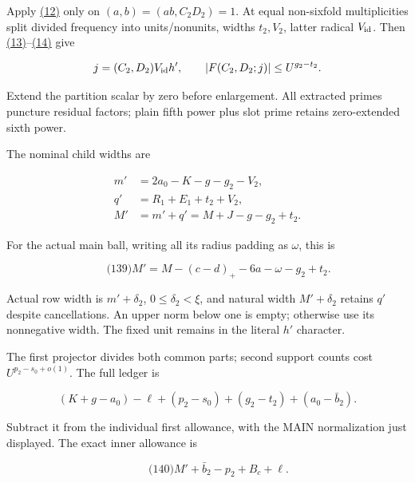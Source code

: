 Apply \protect\hyperlink{cf:eq:A.16}{(12)} only on \((a,b)=(ab,C_2D_2)=1\). At equal non-sixfold multiplicities split divided frequency into units/nonunits, widths \(t_2,V_2\), latter radical \(V_{\rm id}\). Then \protect\hyperlink{cf:eq:A.17}{(13)}--\protect\hyperlink{cf:eq:A.18}{(14)} give

\[
j=(C_2,D_2)V_{\rm id}h',\qquad
 |F(C_2,D_2;j)|\le U^{g_2-t_2}.
\]

Extend the partition scalar by zero before enlargement. All extracted primes puncture residual factors; plain fifth power plus slot prime retains zero-extended sixth power.

The nominal child widths are

\hypertarget{sr:child-width}{}

\label{sr:child-width}

\begin{equation*}
\begin{aligned}
 m'&=2a_0-K-g-g_2-V_2,\\
 q'&=R_1+E_1+t_2+V_2,\\
 M'&=m'+q'=M+J-g-g_2+t_2.
\end{aligned}\tag{138}
\end{equation*}

For the actual main ball, writing all its radius padding as \(\omega\), this is

\hypertarget{sr:main-child-width}{}

\label{sr:main-child-width}

\[
\qquad\text{(139)}
 M'=M-(c-d)_+-6a-\omega-g_2+t_2.
\]

Actual row width is \(m'+\delta_2\), \(0\le\delta_2<\xi\), and natural width \(M'+\delta_2\) retains \(q'\) despite cancellations. An upper norm below one is empty; otherwise use its nonnegative width. The fixed unit remains in the literal \(h'\) character.

The first projector divides both common parts; second support counts cost \(U^{p_2-s_0+o(1)}\). The full ledger is

\[
(K+g-a_0)-\ell+(p_2-s_0)+(g_2-t_2)+(a_0-\bar b_2).
\]

Subtract it from the individual first allowance, with the MAIN normalization just displayed. The exact inner allowance is

\hypertarget{sr:inner-allowance}{}

\label{sr:inner-allowance}

\[
\qquad\text{(140)}
 M'+\bar b_2-p_2+B_c+\ell .
\]

